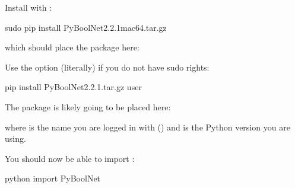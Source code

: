 \documentclass[letterpaper,10pt,english]{sphinxmanual}
\begin{document}
Install  with :

\begin{sphinxVerbatim}[commandchars=\\\{\}]
\PYGZdl{} sudo pip install PyBoolNet\PYGZhy{}2.2.1\PYGZus{}mac64.tar.gz
\end{sphinxVerbatim}

which should place the package here:

\begin{sphinxVerbatim}[commandchars=\\\{\}]
\end{sphinxVerbatim}

Use the option  (literally) if you do not have sudo rights:

\begin{sphinxVerbatim}[commandchars=\\\{\}]
\PYGZdl{} pip install PyBoolNet\PYGZhy{}2.2.1.tar.gz \PYGZhy{}\PYGZhy{}user
\end{sphinxVerbatim}

The package is likely going to be placed here:

\begin{sphinxVerbatim}[commandchars=\\\{\}]
\end{sphinxVerbatim}

where  is the name you are logged in with () and  is the Python version you are using.

You should now be able to import :

\begin{sphinxVerbatim}[commandchars=\\\{\}]
\PYGZdl{} python
\PYGZgt{}\PYGZgt{}\PYGZgt{} import PyBoolNet
\end{sphinxVerbatim}
\end{document}

